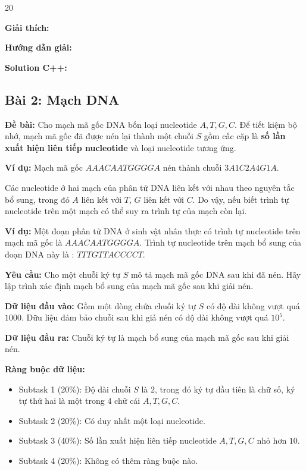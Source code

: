 \documentclass[12pt]{scrartcl}  %
\begin{document}
\begin{tcolorbox}[colback=gray!5!white, colframe=green!50!black, title=Output]
20
\end{tcolorbox}

\textbf{Giải thích:}


\textbf{Hướng dẫn giải:}

\textbf{Solution C++:}

\subsection{Bài 2: Mạch DNA}
\textbf{Đề bài:}
Cho mạch mã gốc DNA bốn loại nucleotide $A, T, G, C$. Để tiết kiệm bộ nhớ, mạch mã gốc đã được nén lại thành một chuỗi $S$ gồm cấc cặp là \textbf{số lần xuất hiện liên tiếp nucleotide} 
và loại nucleotide tương ứng.

\textbf{Ví dụ: } Mạch mã gốc $AAACAATGGGGA$ nén thành chuỗi $3A1C2A4G1A$.

Các nucleotide ở hai mạch của phân tử DNA liên kết với nhau theo nguyên tắc bổ sung, trong đó $A$ liên kết với $T$, $G$ liên kết với $C$. Do vậy, nếu biết trình tự nucleotide trên một mạch có thể suy ra trình tự của mạch còn lại.

\textbf{Ví dụ: } Một đoạn phân tử DNA ở sinh vật nhân thực có trình tự nucleotide trên mạch mã gốc là $AAACAATGGGGA$. Trình tự nucleotide trên mạch bổ sung của đoạn DNA này là : $TTTGTTACCCCT$.

\textbf{Yêu cầu:}
Cho một chuỗi ký tự $S$ mô tả mạch mã gốc DNA sau khi đã nén. Hãy lập trình xác định mạch bổ sung của mạch mã gốc sau khi giải nén.

\textbf{Dữ liệu đầu vào:}
Gồm một dòng chứa chuỗi ký tự $S$ có độ dài không vượt quá $1000$. Dữu liệu đảm bảo chuỗi sau khi giả nén có độ dài không vượt quá $10^5$.

\textbf{Dữ liệu đầu ra:}
Chuỗi ký tự là mạch bổ sung của mạch mã gốc sau khi giải nén.

\textbf{Ràng buộc dữ liệu:}
\begin{itemize}
    \item Subtask 1 (20\%): Độ dài chuỗi $S$ là $2$, trong đó ký tự đầu tiên là chữ số, ký tự thứ hai là một trong $4$ chữ cái $A, T, G, C$. 
    \item Subtask 2 (20\%): Có duy nhất một loại nucleotide. 
    \item Subtask 3 (40\%): Số lần xuất hiện liên tiếp nucleotide $A, T, G, C$ nhỏ hơn $10$.
    \item Subtask 4 (20\%): Không có thêm ràng buộc nào.
\end{itemize}
\end{document}
